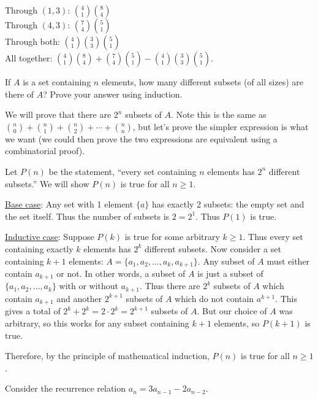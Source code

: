 \documentclass[11pt]{exam}
\begin{document}
\begin{questions}
\begin{solution}
Through $(1,3)$: ${4 \choose 1}{8\choose 4}$\\
Through $(4,3)$: ${7 \choose 4}{5 \choose 1}$\\
Through both: ${4 \choose 1}{3 \choose 3}{5 \choose 1}$\\

All together: ${4 \choose 1}{8\choose 4} + {7 \choose 4}{5 \choose 1} - {4 \choose 1}{3 \choose 3}{5 \choose 1}$.
\end{solution}


\vfill

\question If $A$ is a set containing $n$ elements, how many different subsets (of all sizes) are there of $A$?  Prove your answer using induction.

	\begin{solution}
		We will prove that there are $2^n$ subsets of $A$.  Note this is the same as ${n\choose 0} + {n \choose 1} + {n \choose 2} + \cdots + {n\choose n}$, but let's prove the simpler expression is what we want (we could then prove the two expressions are equivalent using a combinatorial proof).

		Let $P(n)$ be the statement, ``every set containing $n$ elements has $2^n$ different subsets.''  We will show $P(n)$ is true for all $n \ge 1$.

		\underline{Base case}: Any set with 1 element $\{a\}$ has exactly 2 subsets: the empty set and the set itself.  Thus the number of subsets is $2= 2^1$.  Thus $P(1)$ is true.

		\underline{Inductive case}: Suppose $P(k)$ is true for some arbitrary $k \ge 1$.  Thus every set containing exactly $k$ elements has $2^k$ different subsets.  Now consider a set containing $k+1$ elements: $A = \{a_1, a_2, \ldots, a_k, a_{k+1}\}$.  Any subset of $A$ must either contain $a_{k+1}$ or not.  In other words, a subset of $A$ is just a subset of $\{a_1, a_2,\ldots, a_k\}$ with or without $a_{k+1}$.  Thus there are $2^k$ subsets of $A$ which contain $a_{k+1}$ and another $2^{k+1}$ subsets of $A$ which do not contain $a^{k+1}$.  This gives a total of $2^k + 2^k = 2\cdot 2^k = 2^{k+1}$ subsets of $A$.  But our choice of $A$ was arbitrary, so this works for any subset containing $k+1$ elements, so $P(k+1)$ is true.

		Therefore, by the principle of mathematical induction, $P(n)$ is true for all $n \ge 1$.
	\end{solution}

\vfill


\question Consider the recurrence relation $a_n = 3a_{n-1} - 2a_{n-2}$.
\begin{parts}

\end{parts}
\end{questions}
\end{document}
